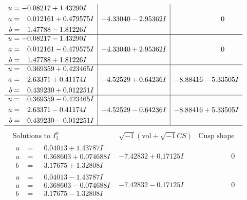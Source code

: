 \documentclass[1p]{elsarticle_modified}
\theoremstyle{definition}
\newcommand{\I}{\sqrt{-1}}
\begin{document}
$$\begin{array}{c|c|c}
\begin{aligned}
u &= -0.08217 + 1.43290 I \\
a &= \phantom{-}0.012161 + 0.479575 I \\
b &= \phantom{-}1.47788 - 1.81226 I\end{aligned}
 & -4.33040 - 2.95362 I & \phantom{-0.000000 } 0 \\ \hline\begin{aligned}
u &= -0.08217 - 1.43290 I \\
a &= \phantom{-}0.012161 - 0.479575 I \\
b &= \phantom{-}1.47788 + 1.81226 I\end{aligned}
 & -4.33040 + 2.95362 I & \phantom{-0.000000 } 0 \\ \hline\begin{aligned}
u &= \phantom{-}0.369359 + 0.423465 I \\
a &= \phantom{-}2.63371 + 0.41174 I \\
b &= \phantom{-}0.439230 + 0.012251 I\end{aligned}
 & -4.52529 + 0.64236 I & -8.88416 - 5.33505 I \\ \hline\begin{aligned}
u &= \phantom{-}0.369359 - 0.423465 I \\
a &= \phantom{-}2.63371 - 0.41174 I \\
b &= \phantom{-}0.439230 - 0.012251 I\end{aligned}
 & -4.52529 - 0.64236 I & -8.88416 + 5.33505 I\\
 \hline 
 \end{array}$$\newpage$$\begin{array}{c|c|c}  
\text{Solutions to }I^u_{1}& \I (\text{vol} + \sqrt{-1}CS) & \text{Cusp shape}\\
 \hline 
\begin{aligned}
u &= \phantom{-}0.04013 + 1.43787 I \\
a &= \phantom{-}0.368603 + 0.074688 I \\
b &= \phantom{-}3.17675 + 1.32808 I\end{aligned}
 & -7.42832 + 0.17125 I & \phantom{-0.000000 } 0 \\ \hline\begin{aligned}
u &= \phantom{-}0.04013 - 1.43787 I \\
a &= \phantom{-}0.368603 - 0.074688 I \\
b &= \phantom{-}3.17675 - 1.32808 I\end{aligned}
 & -7.42832 - 0.17125 I & \phantom{-0.000000 } 0 \\ \hline\begin{aligned}

\end{aligned}
\end{array}$$
\end{document}
